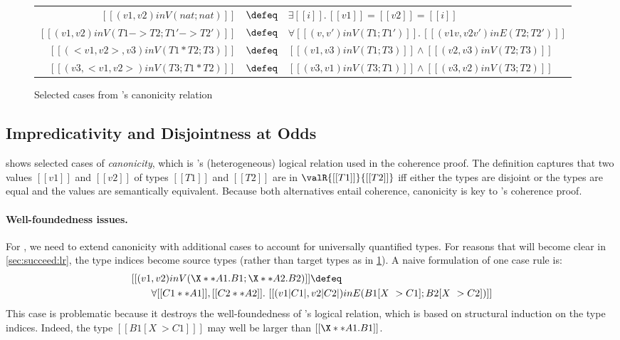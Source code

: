 \begin{figure}[t]
  \centering
  \begin{tabular}{rll}
    $[[(v1 , v2) in V ( nat ; nat ) ]]$  & $\defeq$ & $\exists [[i]].\, [[v1]] = [[v2]] = [[i]]$ \\
    $[[(v1, v2)  in V(T1 -> T2; T1' -> T2') ]]$ &$\defeq$ & $\forall [[(v, v') in V (T1; T1')   ]].\, [[  (v1 v , v2 v') in E (T2 ; T2') ]]$ \\
    $[[( < v1 , v2 > , v3  )  in V ( T1 * T2 ;  T3  )  ]]$  &$\defeq$& $[[ (v1, v3)  in V (T1 ; T3)  ]] \land [[ (v2, v3)  in V (T2 ; T3)  ]]$ \\
    $[[( v3 , < v1 , v2 >  )  in V ( T3 ; T1 * T2  )  ]]$  &$\defeq$& $[[ (v3, v1)  in V (T3 ; T1)  ]] \land [[ (v3, v2)  in V (T3 ; T2)  ]]$
  \end{tabular}
  \caption{Selected cases from \namee's canonicity relation}
  \label{fig:logical:necolus}
\end{figure}

\subsection{Impredicativity and Disjointness at Odds}
\label{sec:failed:lr}

 shows selected cases of \emph{canonicity},
which is \namee's (heterogeneous) logical relation used
in the coherence proof. The definition captures that two values
$[[v1]]$ and $[[v2]]$ of types $[[ T1 ]]$ and $[[T2]]$ are in $\valR{[[T1]]}{[[T2]]}$ iff
either the types are disjoint or the types are equal and the values are
semantically equivalent. Because both alternatives entail coherence, 
canonicity is key to \namee's coherence proof.

\paragraph{Well-foundedness issues.}
For \fnamee, we need to extend canonicity with additional cases to
account for universally quantified types. For reasons that will become clear in
\cref{sec:succeed:lr}, the type indices become source types (rather than target types as in \cref{fig:logical:necolus}).
A naive formulation of one case rule is:
{\small
\begin{align*}
    &[[(v1, v2)  in V(\X ** A1 . B1; \X ** A2 . B2) ]] \defeq  \\
    &\qquad \forall [[C1 ** A1]], [[C2 ** A2]].\ [[( v1 | C1 | , v2 | C2 | ) in E ( B1 [X ~> C1]; B2 [X ~> C2]) ]]
\end{align*}
}%
This case is problematic because it destroys the well-foundedness of \namee's
logical relation, which is based on structural induction on the type indices.
Indeed, the type $[[ B1 [X ~> C1] ]]$ may well be larger than $[[ \X ** A1 . B1 ]]$.


